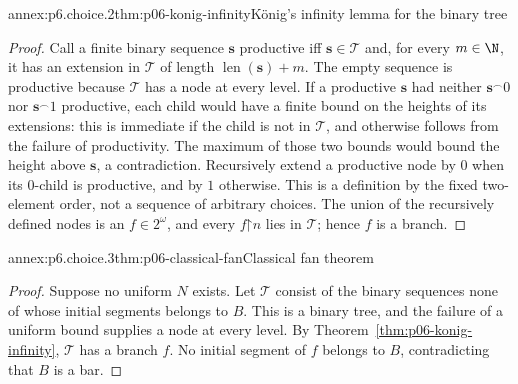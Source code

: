 \begin{annexitem}{annex:p6.choice.2}{thm:p06-konig-infinity}{K\"onig's infinity lemma for the binary tree}
\begin{proof}
Call a finite binary sequence \(\mathbf s\) productive iff
\(\mathbf s\in\mathcal T\) and, for every
\(m\in\N\), it has an extension in \(\mathcal T\) of length
\(\operatorname{len}(\mathbf s)+m\).  The empty sequence is productive because
\(\mathcal T\) has a node at every level.  If a productive \(\mathbf s\) had neither
\(\mathbf s^\frown0\) nor \(\mathbf s^\frown1\) productive, each child would have a finite
bound on the heights of its extensions: this is immediate if the child is not
in \(\mathcal T\), and otherwise follows from the failure of productivity.  The maximum
of those two bounds would bound the height above \(\mathbf s\), a contradiction.
Recursively extend a productive node by \(0\) when its
\(0\)-child is productive, and by \(1\) otherwise.  This is a definition by
the fixed two-element order, not a sequence of arbitrary choices.  The union
of the recursively defined nodes is an \(f\in2^\omega\), and every
\(f\mathord{\upharpoonright}n\) lies in \(\mathcal T\); hence \(f\) is a branch.
\end{proof}
\end{annexitem}

\begin{annexitem}{annex:p6.choice.3}{thm:p06-classical-fan}{Classical fan theorem}
\begin{proof}
Suppose no uniform \(N\) exists.  Let \(\mathcal T\) consist of the binary sequences
none of whose initial segments belongs to \(B\).  This is a binary tree, and
the failure of a uniform bound supplies a node at every level.  By
Theorem~\ref{thm:p06-konig-infinity}, \(\mathcal T\) has a branch \(f\).  No initial
segment of \(f\) belongs to \(B\), contradicting that \(B\) is a bar.
\end{proof}
\end{annexitem}
